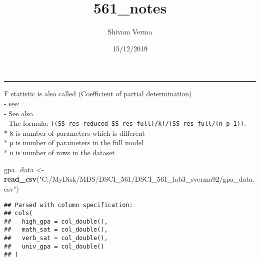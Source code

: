 \documentclass[]{article}
\title{561\_notes}
\author{Shivam Verma}
\date{15/12/2019}
\newenvironment{Shaded}{\begin{snugshade}}{\end{snugshade}}
\newcommand{\KeywordTok}[1]{\textcolor[rgb]{0.13,0.29,0.53}{\textbf{#1}}}
\newcommand{\NormalTok}[1]{#1}
\newcommand{\StringTok}[1]{\textcolor[rgb]{0.31,0.60,0.02}{#1}}
\begin{document}
\maketitle

\begin{center}\rule{0.5\linewidth}{\linethickness}\end{center}

F statistic is also called (Coefficient of partial determination)\\
-
\href{https://en.wikipedia.org/wiki/Coefficient_of_determination}{see:}\\
-
\href{http://facweb.cs.depaul.edu/sjost/csc423/documents/f-test-reg.htm}{See
also}\\
- The formula:
\texttt{((SS\_res\_reduced-SS\_res\_full)/k)/(SS\_res\_full/(n-p-1))}.\\
* \texttt{k} is number of parameters which is different\\
* \texttt{p} is number of parameters in the full model\\
* \texttt{n} is number of rows in the dataset

\begin{Shaded}
\begin{Highlighting}[]
\NormalTok{gpa_data <-}\StringTok{ }\KeywordTok{read_csv}\NormalTok{(}\StringTok{"C:/MyDisk/MDS/DSCI_561/DSCI_561_lab3_sverma92/gpa_data.csv"}\NormalTok{)}
\end{Highlighting}
\end{Shaded}

\begin{verbatim}
## Parsed with column specification:
## cols(
##   high_gpa = col_double(),
##   math_sat = col_double(),
##   verb_sat = col_double(),
##   univ_gpa = col_double()
## )
\end{verbatim}
\end{document}

